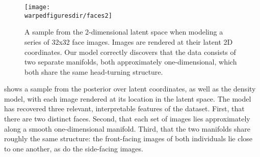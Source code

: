 \begin{figure}[h!]
\centering
\texttt{[image: \\warpedfiguresdir/faces2]}
\caption[Latent clusters of face images]{A sample from the 2-dimensional latent space when modeling a series of 32x32 face images.
Images are rendered at their latent 2D coordinates.
Our model correctly discovers that the data consists of two separate manifolds, both approximately one-dimensional, which both share the same head-turning structure.}
\label{fig:faces}
\end{figure}

 shows a sample from the posterior over latent coordinates, as well as the density model, with each image rendered at its location in the latent space.
The model has recovered three relevant, interpretable features of the dataset.
First, that there are two distinct faces.
Second, that each set of images lies approximately along a smooth one-dimensional manifold.
Third, that the two manifolds share roughly the same structure: the front-facing images of both individuals lie close to one another, as do the side-facing images.


